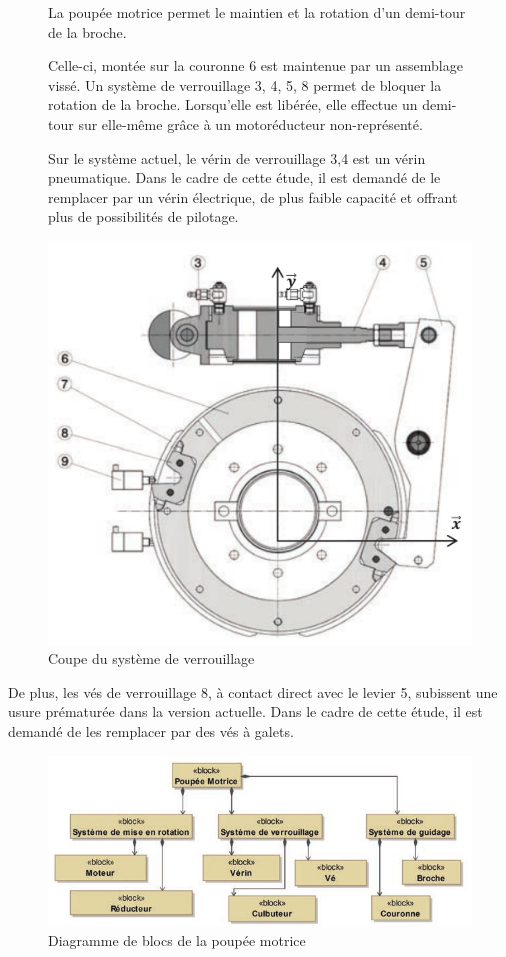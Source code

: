 \begin{figure}[!h]
\begin{minipage}{0.55\linewidth}
La poupée motrice permet le maintien et la rotation d’un demi-tour de la broche.

Celle-ci, montée sur la couronne 6 est maintenue par un assemblage vissé. Un système de verrouillage {3, 4, 5, 8} permet de bloquer la rotation de la broche. Lorsqu’elle est libérée, elle effectue un demi-tour sur elle-même grâce à un motoréducteur non-représenté.

Sur le système actuel, le vérin de verrouillage {3,4} est un vérin pneumatique. Dans le cadre de cette étude, il est demandé de le remplacer par un vérin électrique, de plus faible capacité et offrant plus de possibilités de pilotage.
\end{minipage}\hfill
\begin{minipage}{0.42\linewidth}
\centering\includegraphics[width=0.95\linewidth]{img/fig06}
 \caption{Coupe du système de verrouillage}
 \label{img06}
\end{minipage}
\end{figure}

De  plus,  les  vés  de  verrouillage  8,  à  contact  direct  avec  le  levier  5,  subissent  une  usure  prématurée  dans  la  version  actuelle.  Dans  le  cadre  de  cette  étude,  il  est  demandé  de  les  remplacer par des vés à galets.

\begin{figure}[!h]
\centering\includegraphics[width=0.6\linewidth]{img/fig07}
 \caption{Diagramme de blocs de la poupée motrice}
 \label{img07}
\end{figure}

